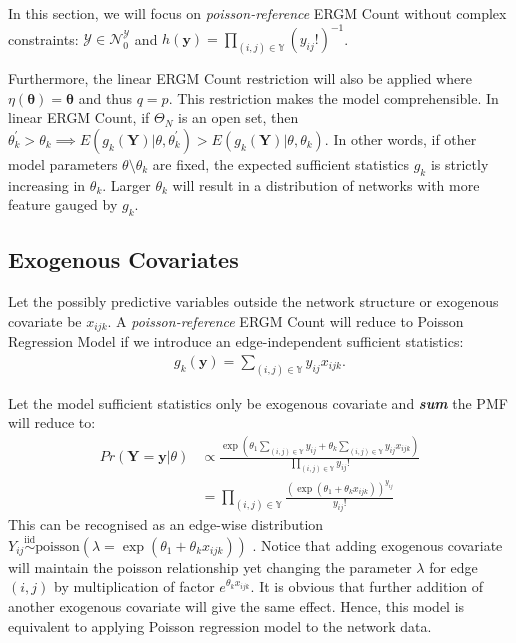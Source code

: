 \documentclass[12pt,a4paper,twoside,openany]{book}
\newcommand{\BI}[1]{\textit{\textbf{#1}}}
\begin{document}
In this section, we will focus on \textit{poisson-reference} ERGM Count without complex constraints: $\mathcal{Y} \in \mathcal{N}_0^{\mathcal{Y}}$ and $h(\bm{y}) = \prod_{(i,j) \in \mathbb{Y}}(y_{ij}!)^{-1}$. 

Furthermore, the linear ERGM Count restriction will also be applied where $\eta(\bm{\theta}) = \bm{\theta}$ and thus $q = p$. 
This restriction makes the model comprehensible. 
In linear ERGM Count, if $\Theta_{N}$ is an open set, then $\theta_{k}^{\prime} >\theta_{k} \implies E(g_k(\bm{Y})|\theta,\theta_k^{\prime})>E(g_k(\bm{Y})|\theta,\theta_k)$. 
In other words, if other model parameters $\theta \setminus \theta_k$ are fixed, the expected sufficient statistics $g_k$ is strictly increasing in $\theta_k$.
Larger $\theta_k$ will result in a distribution of networks with more feature gauged by $g_k$.

\subsection{Exogenous Covariates}
Let the possibly predictive variables outside the network structure or exogenous covariate be $x_{ijk}$.
A \textit{poisson-reference} ERGM Count will reduce to Poisson Regression Model if we introduce an edge-independent sufficient statistics:
\begin{align}
g_k(\bm{y})= \sum_{(i,j) \in \mathbb{Y}} y_{ij}x_{ijk}.
\end{align}

Let the model sufficient statistics only be exogenous covariate and \BI{sum}  the PMF will reduce to:
\begin{align*}
Pr(\bm{Y}=\bm{y}|\theta) &\propto \frac{\exp\left(\theta_1 \sum_{(i,j) \in \mathbb{Y}} y_{ij} + \theta_k \sum_{(i,j) \in \mathbb{Y}} y_{ij}x_{ijk} \right)}{\prod_{(i,j) \in \mathbb{Y}}y_{ij}!} \\
&= \prod_{(i,j) \in \mathbb{Y}} \frac{(\exp(\theta_1+\theta_k x_{ijk}))^{y_{ij}}}{y_{ij}!}
\end{align*}
This can be recognised as an edge-wise distribution $Y_{ij}\stackrel{\text{iid}}{\sim}\text{poisson}(\lambda =\exp(\theta_1 + \theta_k x_{ijk}))$ .
Notice that adding exogenous covariate will maintain the poisson relationship yet changing the parameter $\lambda$ for edge $(i,j)$ by multiplication of factor $e^{\theta_k x_{ijk}}$.
It is obvious that further addition of another exogenous covariate will give the same effect.
Hence, this model is equivalent to applying Poisson regression model to the network data.  
\end{document}
